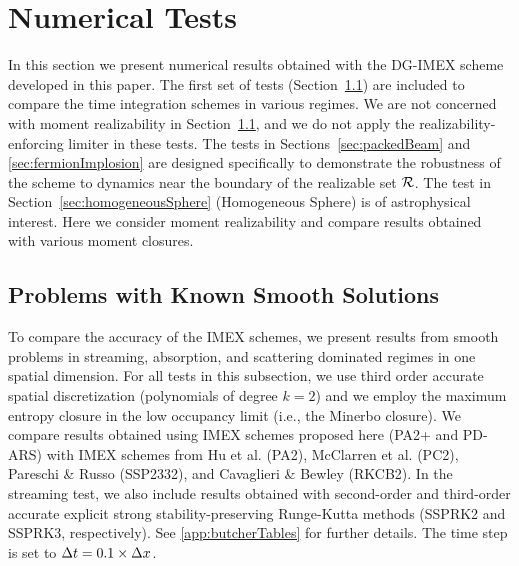 \section{Numerical Tests}
\label{sec:numerical}

In this section we present numerical results obtained with the DG-IMEX scheme developed in this paper.  
The first set of tests (Section~\ref{sec:smoothProblems}) are included to compare the time integration schemes in various regimes.  
We are not concerned with moment realizability in Section~\ref{sec:smoothProblems}, and we do not apply the realizability-enforcing limiter in these tests.  
The tests in Sections~\ref{sec:packedBeam} and \ref{sec:fermionImplosion} are designed specifically to demonstrate the robustness of the scheme to dynamics near the boundary of the realizable set $\mathcal{R}$.  
The test in Section~\ref{sec:homogeneousSphere} (Homogeneous Sphere) is of astrophysical interest.  
Here we consider moment realizability and compare results obtained with various moment closures.  

\subsection{Problems with Known Smooth Solutions}
\label{sec:smoothProblems}

To compare the accuracy of the IMEX schemes, we present results from smooth problems in streaming, absorption, and scattering dominated regimes in one spatial dimension.  
For all tests in this subsection, we use third order accurate spatial discretization (polynomials of degree $k=2$) and we employ the maximum entropy closure in the low occupancy limit (i.e., the Minerbo closure).  
We compare results obtained using IMEX schemes proposed here (PA2+ and PD-ARS) with IMEX schemes from Hu et al. \cite{hu_etal_2018} (PA2), McClarren et al. \cite{mcclarren_etal_2008} (PC2), Pareschi \& Russo \cite{pareschiRusso_2005} (SSP2332), and Cavaglieri \& Bewley \cite{cavaglieriBewley2015} (RKCB2).  
In the streaming test, we also include results obtained with second-order and third-order accurate explicit strong stability-preserving Runge-Kutta methods \cite{gottlieb_etal_2001} (SSPRK2 and SSPRK3, respectively).  
See \ref{app:butcherTables} for further details.  
The time step is set to $\Delta t=0.1\times\Delta x$.  

